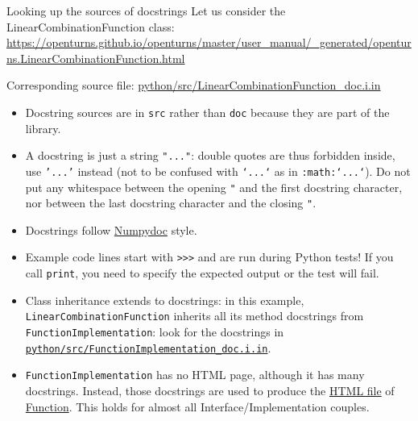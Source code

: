 \documentclass[8pt, handout]{beamer}
\begin{document}
\begin{frame}{Looking up the sources of docstrings}
Let us consider the \alert{LinearCombinationFunction} class:
\url{https://openturns.github.io/openturns/master/user_manual/_generated/openturns.LinearCombinationFunction.html}

Corresponding source file:
\href{https://github.com/openturns/openturns/blob/master/python/src/LinearCombinationFunction_doc.i.in}{python/\alert{src}/LinearCombinationFunction\_doc.i.in}

\begin{itemize}
    \item Docstring sources are in \texttt{src} rather than \texttt{doc} because they are part of the library.
    \item A docstring is just a string \texttt{"..."}: double quotes are thus forbidden inside, use \texttt{'...'} instead (not to be confused with \texttt{`...`} as in \texttt{:math:`...`}). Do not put any whitespace between the opening \texttt{"} and the first docstring character, nor between the last docstring character and the closing \texttt{"}.
    \item Docstrings follow \href{https://numpydoc.readthedocs.io/en/latest/index.html}{\alert{Numpydoc}} style.
    \item Example code lines start with \texttt{>{}>{}>} and are run during Python tests! If you call \texttt{print}, you need to specify the expected output or the test will fail.
    \item Class inheritance extends to docstrings: in this example, \texttt{LinearCombinationFunction} inherits all its method docstrings from \alert{\texttt{FunctionImplementation}}: look for the docstrings in \href{https://github.com/openturns/openturns/blob/master/python/src/FunctionImplementation_doc.i.in}{\texttt{python/src/FunctionImplementation\_doc.i.in}}.
    \item \texttt{FunctionImplementation} has no HTML page, although it has many docstrings.
    Instead, those docstrings are used to produce the \href{https://openturns.github.io/openturns/master/user_manual/_generated/openturns.Function.html}{\alert{HTML file}}
    of \href{https://github.com/openturns/openturns/blob/master/python/src/Function_doc.i.in}{\alert{Function}}.
    This holds for almost all Interface/Implementation couples.
\end{itemize}
    
\end{frame}
\end{document}
